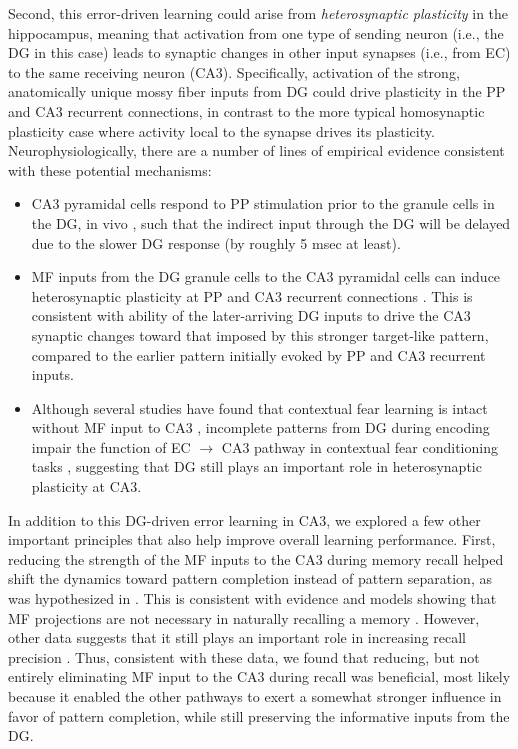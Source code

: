 \documentclass[10pt,letterpaper]{article}
\begin{document}
Second, this error-driven learning could arise from \emph{heterosynaptic plasticity} in the hippocampus, meaning that activation from one type of sending neuron (i.e., the DG in this case) leads to synaptic changes in other input synapses (i.e., from EC) to the same receiving neuron (CA3).  Specifically, activation of the strong, anatomically unique mossy fiber inputs from DG could drive plasticity in the PP and CA3 recurrent connections, in contrast to the more typical homosynaptic plasticity case where activity local to the synapse drives its plasticity.  Neurophysiologically, there are a number of lines of empirical evidence consistent with these potential mechanisms:
\begin{itemize}

	\item CA3 pyramidal cells respond to PP stimulation prior to the granule cells in the DG, in vivo \cite{YeckelBerger90,DoMartinezMartinezEtAl02}, such that the indirect input through the DG will be delayed due to the slower DG response (by roughly 5 msec at least).

    \item MF inputs from the DG granule cells to the CA3 pyramidal cells can induce heterosynaptic plasticity at PP and CA3 recurrent connections \cite{McMahonBarrionuevo02,TsukamotoYasuiYamadaEtAl03,KobayashiPoo04,RebolaCartaMulle17}. This is consistent with ability of the later-arriving DG inputs to drive the CA3 synaptic changes toward that imposed by this stronger target-like pattern, compared to the earlier pattern initially evoked by PP and CA3 recurrent inputs.

    \item Although several studies have found that contextual fear learning is intact without MF input to CA3 \cite{McHughJonesQuinnEtAl07,NakashibaCushmanPelkeyEtAl12,KitamuraSunMartinEtAl15}, incomplete patterns from DG during encoding impair the function of EC $\rightarrow$ CA3 pathway in contextual fear conditioning tasks \cite{BernierLacagninaAyoubEtAl17}, suggesting that DG still plays an important role in heterosynaptic plasticity at CA3.
\end{itemize}

In addition to this DG-driven error learning in CA3, we explored a few other important principles that also help improve overall learning performance.  First, reducing the strength of the MF inputs to the CA3 during memory recall helped shift the dynamics toward pattern completion instead of pattern separation, as was hypothesized in \cite{OReillyMcClelland94}.  This is consistent with evidence and models showing that MF projections are not necessary in naturally recalling a memory \cite{NakashibaCushmanPelkeyEtAl12,BernierLacagninaAyoubEtAl17,Rolls13}.  However, other data suggests that it still plays an important role in increasing recall precision \cite{RuedigerVittoriBednarekEtAl11,NakashibaCushmanPelkeyEtAl12,BernierLacagninaAyoubEtAl17,PignatelliRyanRoyEtAl19}. Thus, consistent with these data, we found that reducing, but not entirely eliminating MF input to the CA3 during recall was beneficial, most likely because it enabled the other pathways to exert a somewhat stronger influence in favor of pattern completion, while still preserving the informative inputs from the DG.
\end{document}
